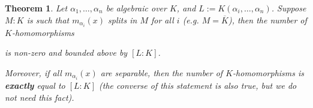 \documentclass[11pt]{book}
\newtheorem{theorem}{Theorem}[section]
\begin{document}
\begin{theorem} \label{thm-genKhomo}
Let $\alpha_1, \dots, \alpha_n$ be algebraic over $K$, and $L := K(\alpha_i, \dots, \alpha_n)$. Suppose $M:K$ is such that $m_{\alpha_i}(x)$ splits in $M$ for all $i$ (e.g. $M = \overline{K}$), then the number of $K$-homomorphisms

is non-zero and bounded above by $[L:K]$. 

Moreover, if all $m_{\alpha_i}(x)$ are separable, then the number of $K$-homomorphisms is {\bf exactly} equal to $[L:K]$ (the converse of this statement is also true, but we do not need this fact).
\end{theorem}
\end{document}
